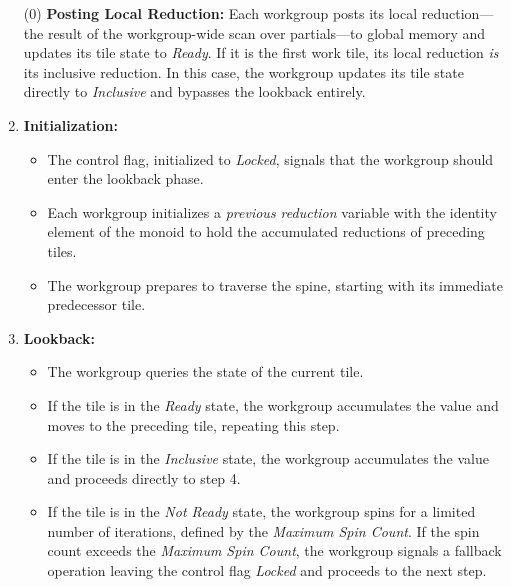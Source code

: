 \documentclass[sigconf]{acmart}
\begin{document}
\begin{enumerate}
  \item[(0)] \textbf{Posting Local Reduction:} Each workgroup posts its local reduction---the result of the workgroup-wide scan over partials---to global memory and updates its tile state to \emph{Ready}. If it is the first work tile, its local reduction \emph{is} its inclusive reduction. In this case, the workgroup updates its tile state directly to \emph{Inclusive} and bypasses the lookback entirely.

  \item \textbf{Initialization:}
        \begin{itemize}
          \item The control flag, initialized to \emph{Locked}, signals that the workgroup should enter the lookback phase.
          \item Each workgroup initializes a \emph{previous reduction} variable with the identity element of the monoid to hold the accumulated reductions of preceding tiles.
          \item The workgroup prepares to traverse the spine, starting with its immediate predecessor tile.
        \end{itemize}

  \item \textbf{Lookback:}
  \begin{itemize}
      \item The workgroup queries the state of the current tile. 
      \item If the tile is in the \emph{Ready} state, the workgroup accumulates the value and moves to the preceding tile, repeating this step.
      \item If the tile is in the \emph{Inclusive} state, the workgroup accumulates the value and proceeds directly to step 4.
      \item If the tile is in the \emph{Not Ready} state, the workgroup spins for a limited number of iterations, defined by the \emph{Maximum Spin Count}. If the spin count exceeds the \emph{Maximum Spin Count}, the workgroup signals a fallback operation leaving the control flag \emph{Locked} and proceeds to the next step.
  \end{itemize}


\end{enumerate}
\end{document}
